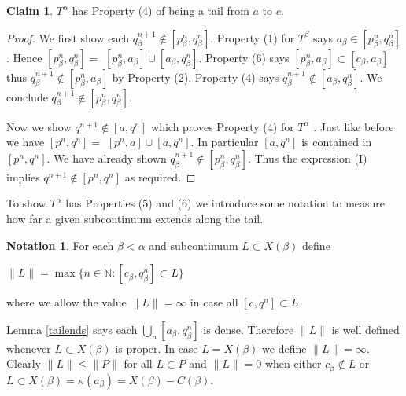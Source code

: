 \documentclass[12pt]{article}
\theoremstyle{plain}
\theoremstyle{definition}
\newcounter{ClaimCounter}
\newtheorem{claim}[ClaimCounter]{Claim}
\newcounter{claim5counter}
\newtheorem{notation}[theorem]{Notation}
\newcommand{\A}{\ensuremath{\alpha}}
\newcommand{\K}{\ensuremath{\kappa}}
\newcommand{\B}{\ensuremath{\beta}}
\newcommand{\NN}{\ensuremath{\mathbb N}}
\newcommand{\0}{\ensuremath{\varnothing}}
\begin{document}
	\begin{claim}\label{longlim2}
		$T^\A$ has Property (4) of being a tail from $a$ to $c$.
	\end{claim}
	
	\begin{proof}
		We first show each $q^{n+1}_\B \notin [p^n_\B,q^n_\B]$.
		Property (1) for $T^\B$ says $a_\B \in [p^n_\B,q^n_\B]$.
		Hence $[p^n_\B,q^n_\B] = $ $[p^n_\B,a_\B] \cup [a_\B,q^n_\B]$.
		Property (6) says $[p^n_\B,a_\B] \subset [c_\B,a_\B]$ thus \mbox{$q^{n+1}_\B \notin [p^n_\B,a_\B]$} by Property (2).
		Property (4) says $q^{n+1}_\B \notin [a_\B,q^n_\B]$.
		We conclude $q^{n+1}_\B \notin [p^n_\B,q^n_\B]$.
		
		Now we show $q^{n+1} \notin [a,q^n]$ which proves Property (4) for $T^\A$ .
		Just like before we have $[p^n,q^n] = $ $[p^n,a] \cup [a,q^n]$.
		In particular $[a,q^n]$ is contained in $[p^n,q^n]$.
		We have already shown $q^{n+1}_\B \notin [p^n_\B,q^n_\B]$.
		Thus the expression (I) implies $q^{n+1} \notin [p^n,q^n]$ as required.
	\end{proof}
	
	To show $T^\A$ has Properties (5) and (6) we introduce some notation to measure how far a given subcontinuum extends along the tail.
	
	\begin{notation}
		For each $\B<\A$ and subcontinuum $L \subset X(\B)$
		define 
		
		\begin{center}
			$\|L\| = \max \big \{n \in \NN : [c_\B,q^n_\B] \subset L \big \}$
		\end{center}
		
		where we allow the value $\|L\|= \infty$ in case all $[c,q^n] \subset L$
	\end{notation}
	
	Lemma \ref{tailends} says each $\bigcup_n [a_\B,q^n_\B]$ is dense.
	Therefore $\|L\|$ is well defined whenever $L \subset X(\B)$ is proper.
	In case $L = X(\B)$ we define $\|L\| = \infty$.
	Clearly $\|L\| \le \|P\|$ for all $L \subset P$
	and $\|L\|=0$ when either $c_\B \notin L$ or $L \subset X(\B) = \K(a_\B) = X(\B)-C(\B)$.
	
	
\end{document}
